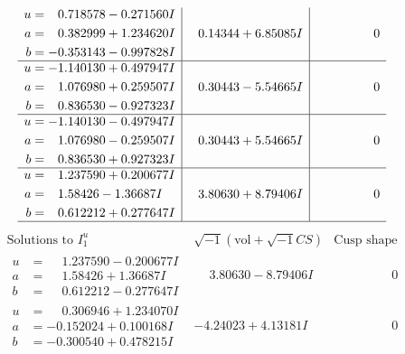 \documentclass[1p]{elsarticle_modified}
\theoremstyle{definition}
\newcommand{\I}{\sqrt{-1}}
\begin{document}
$$\begin{array}{c|c|c}
\begin{aligned}
u &= \phantom{-}0.718578 - 0.271560 I \\
a &= \phantom{-}0.382999 + 1.234620 I \\
b &= -0.353143 - 0.997828 I\end{aligned}
 & \phantom{-}0.14344 + 6.85085 I & \phantom{-0.000000 } 0 \\ \hline\begin{aligned}
u &= -1.140130 + 0.497947 I \\
a &= \phantom{-}1.076980 + 0.259507 I \\
b &= \phantom{-}0.836530 - 0.927323 I\end{aligned}
 & \phantom{-}0.30443 - 5.54665 I & \phantom{-0.000000 } 0 \\ \hline\begin{aligned}
u &= -1.140130 - 0.497947 I \\
a &= \phantom{-}1.076980 - 0.259507 I \\
b &= \phantom{-}0.836530 + 0.927323 I\end{aligned}
 & \phantom{-}0.30443 + 5.54665 I & \phantom{-0.000000 } 0 \\ \hline\begin{aligned}
u &= \phantom{-}1.237590 + 0.200677 I \\
a &= \phantom{-}1.58426 - 1.36687 I \\
b &= \phantom{-}0.612212 + 0.277647 I\end{aligned}
 & \phantom{-}3.80630 + 8.79406 I & \phantom{-0.000000 } 0\\
 \hline 
 \end{array}$$\newpage$$\begin{array}{c|c|c}  
\text{Solutions to }I^u_{1}& \I (\text{vol} + \sqrt{-1}CS) & \text{Cusp shape}\\
 \hline 
\begin{aligned}
u &= \phantom{-}1.237590 - 0.200677 I \\
a &= \phantom{-}1.58426 + 1.36687 I \\
b &= \phantom{-}0.612212 - 0.277647 I\end{aligned}
 & \phantom{-}3.80630 - 8.79406 I & \phantom{-0.000000 } 0 \\ \hline\begin{aligned}
u &= \phantom{-}0.306946 + 1.234070 I \\
a &= -0.152024 + 0.100168 I \\
b &= -0.300540 + 0.478215 I\end{aligned}
 & -4.24023 + 4.13181 I & \phantom{-0.000000 } 0 \\ \hline\begin{aligned}

\end{aligned}
\end{array}$$
\end{document}
